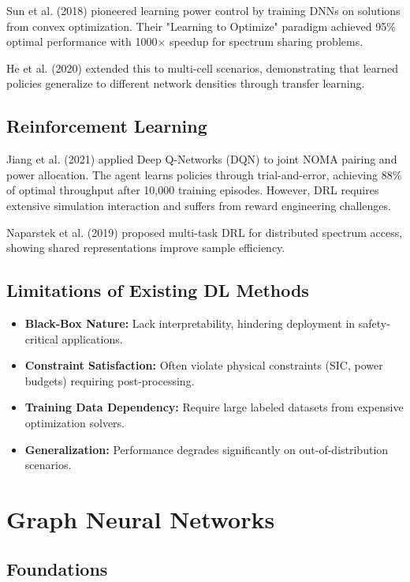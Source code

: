 Sun et al. (2018) \cite{sun2015learning} pioneered learning power control by training DNNs on solutions from convex optimization. Their "Learning to Optimize" paradigm achieved 95\% optimal performance with 1000× speedup for spectrum sharing problems.

He et al. (2020) \cite{he2020learning} extended this to multi-cell scenarios, demonstrating that learned policies generalize to different network densities through transfer learning.

\subsection{Reinforcement Learning}

Jiang et al. (2021) \cite{jiang2021joint} applied Deep Q-Networks (DQN) to joint NOMA pairing and power allocation. The agent learns policies through trial-and-error, achieving 88\% of optimal throughput after 10,000 training episodes. However, DRL requires extensive simulation interaction and suffers from reward engineering challenges.

Naparstek et al. (2019) \cite{naparstek2019deep} proposed multi-task DRL for distributed spectrum access, showing shared representations improve sample efficiency.

\subsection{Limitations of Existing DL Methods}

\begin{itemize}
    \item \textbf{Black-Box Nature:} Lack interpretability, hindering deployment in safety-critical applications.
    \item \textbf{Constraint Satisfaction:} Often violate physical constraints (SIC, power budgets) requiring post-processing.
    \item \textbf{Training Data Dependency:} Require large labeled datasets from expensive optimization solvers.
    \item \textbf{Generalization:} Performance degrades significantly on out-of-distribution scenarios.
\end{itemize}

\section{Graph Neural Networks}

\subsection{Foundations}

